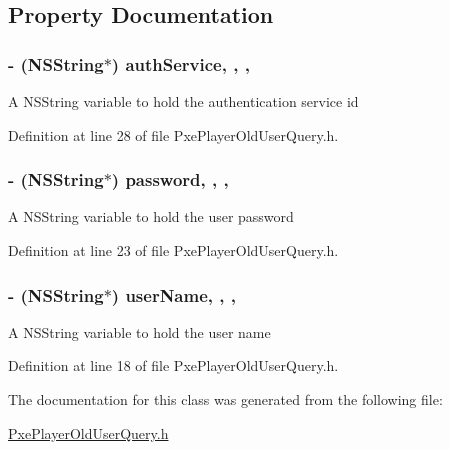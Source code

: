 \subsection{Property Documentation}
\hypertarget{interface_pxe_player_old_user_query_ac42b4b905ce3a623ce6e3f46cebdcf78}{
\subsubsection[{auth\-Service}]{\setlength{\rightskip}{0pt plus 5cm}-\/ (N\-S\-String$\ast$) auth\-Service\hspace{0.3cm}{\ttfamily [read]}, {\ttfamily [write]}, {\ttfamily [nonatomic]}, {\ttfamily [strong]}}}\label{interface_pxe_player_old_user_query_ac42b4b905ce3a623ce6e3f46cebdcf78}
A N\-S\-String variable to hold the authentication service id 

Definition at line 28 of file Pxe\-Player\-Old\-User\-Query.\-h.

\hypertarget{interface_pxe_player_old_user_query_ae8c668b61248ad659fdc018e1656b370}{
\subsubsection[{password}]{\setlength{\rightskip}{0pt plus 5cm}-\/ (N\-S\-String$\ast$) password\hspace{0.3cm}{\ttfamily [read]}, {\ttfamily [write]}, {\ttfamily [nonatomic]}, {\ttfamily [strong]}}}\label{interface_pxe_player_old_user_query_ae8c668b61248ad659fdc018e1656b370}
A N\-S\-String variable to hold the user password 

Definition at line 23 of file Pxe\-Player\-Old\-User\-Query.\-h.

\hypertarget{interface_pxe_player_old_user_query_ab600ae874f1762b3ba3de1d91f057836}{
\subsubsection[{user\-Name}]{\setlength{\rightskip}{0pt plus 5cm}-\/ (N\-S\-String$\ast$) user\-Name\hspace{0.3cm}{\ttfamily [read]}, {\ttfamily [write]}, {\ttfamily [nonatomic]}, {\ttfamily [strong]}}}\label{interface_pxe_player_old_user_query_ab600ae874f1762b3ba3de1d91f057836}
A N\-S\-String variable to hold the user name 

Definition at line 18 of file Pxe\-Player\-Old\-User\-Query.\-h.



The documentation for this class was generated from the following file\-:\begin{DoxyCompactItemize}
\item 
\hyperlink{_pxe_player_old_user_query_8h}{Pxe\-Player\-Old\-User\-Query.\-h}\end{DoxyCompactItemize}
